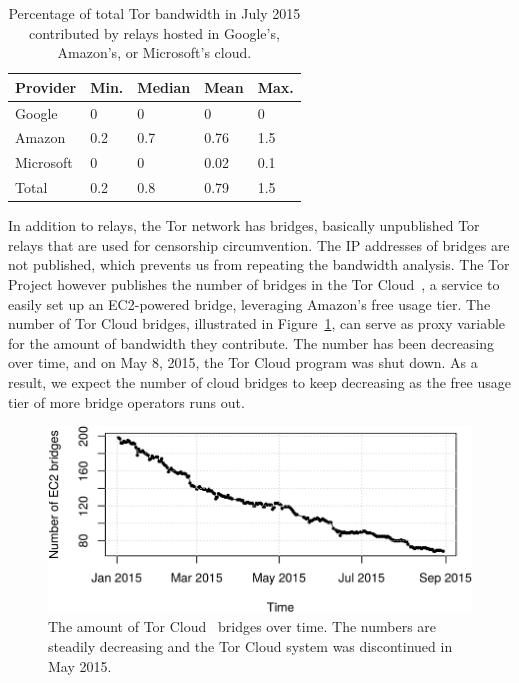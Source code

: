 \begin{table}[t]
	\centering
	\begin{tabular}{lllll}
	\textbf{Provider} & \textbf{Min.} & \textbf{Median} & \textbf{Mean} & \textbf{Max.} \\
	\hline
	Google & 0 & 0 & 0 & 0 \\
	Amazon & 0.2 & 0.7 & 0.76 & 1.5 \\
	Microsoft & 0 & 0 & 0.02 & 0.1 \\
	\hline
	Total & 0.2 & 0.8 & 0.79 & 1.5 \\
	\end{tabular}
	\caption{Percentage of total Tor bandwidth in July 2015 contributed by
	relays hosted in Google's, Amazon's, or Microsoft's cloud.}
	\label{tab:bwfraction}
\end{table}

In addition to relays, the Tor network has bridges, basically unpublished Tor
relays that are used for censorship circumvention.  The IP addresses of bridges
are not published, which prevents us from repeating the bandwidth analysis.  The
Tor Project however publishes the number of bridges in the Tor
Cloud~\cite{torcloud}, a service to easily set up an EC2-powered bridge,
leveraging Amazon's free usage tier.  The number of Tor Cloud bridges,
illustrated in Figure~\ref{fig:cloudbridges}, can serve as proxy variable for
the amount of bandwidth they contribute.  The number has been decreasing over
time, and on May 8, 2015, the Tor Cloud program was shut down.  As a result, we
expect the number of cloud bridges to keep decreasing as the free usage tier of
more bridge operators runs out.

\begin{figure}[t]
	\centering
	\includegraphics[width=\linewidth]{diagrams/torcloud.pdf}
	\caption{The amount of Tor Cloud~\cite{torcloud} bridges over time.  The
	numbers are steadily decreasing and the Tor Cloud system was discontinued in
	May 2015.}
	\label{fig:cloudbridges}
\end{figure}
